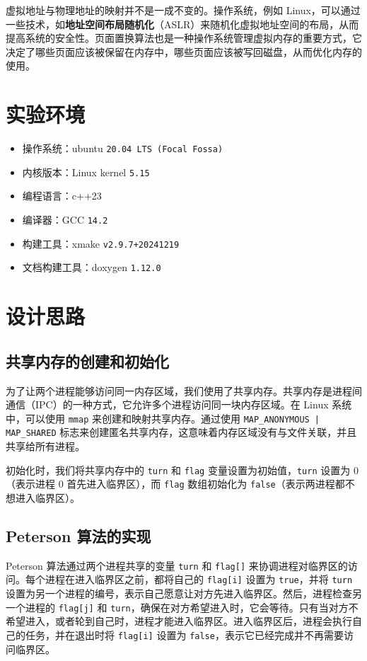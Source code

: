 虚拟地址与物理地址的映射并不是一成不变的。操作系统，例如 Linux，可以通过一些技术，如\textbf{地址空间布局随机化}（ASLR）来随机化虚拟地址空间的布局，从而提高系统的安全性。页面置换算法也是一种操作系统管理虚拟内存的重要方式，它决定了哪些页面应该被保留在内存中，哪些页面应该被写回磁盘，从而优化内存的使用。

\section{实验环境}

\begin{itemize}
    \item 操作系统：ubuntu \texttt{20.04 LTS (Focal Fossa)}
    \item 内核版本：Linux kernel \texttt{5.15}
    \item 编程语言：c++23
    \item 编译器：GCC \texttt{14.2}
    \item 构建工具：xmake \texttt{v2.9.7+20241219}
    \item 文档构建工具：doxygen \texttt{1.12.0}
\end{itemize}

\section{设计思路}

\subsection{共享内存的创建和初始化}

为了让两个进程能够访问同一内存区域，我们使用了共享内存。共享内存是进程间通信（IPC）的一种方式，它允许多个进程访问同一块内存区域。在 Linux 系统中，可以使用 \texttt{mmap} 来创建和映射共享内存。通过使用 \texttt{MAP\_ANONYMOUS | MAP\_SHARED} 标志来创建匿名共享内存，这意味着内存区域没有与文件关联，并且共享给所有进程。

初始化时，我们将共享内存中的 \texttt{turn} 和 \texttt{flag} 变量设置为初始值，\texttt{turn} 设置为 0（表示进程 0 首先进入临界区），而 \texttt{flag} 数组初始化为 \texttt{false}（表示两进程都不想进入临界区）。

\subsection{Peterson 算法的实现}

Peterson 算法通过两个进程共享的变量 \texttt{turn} 和 \texttt{flag[]} 来协调进程对临界区的访问。每个进程在进入临界区之前，都将自己的 \texttt{flag[i]} 设置为 \texttt{true}，并将 \texttt{turn} 设置为另一个进程的编号，表示自己愿意让对方先进入临界区。然后，进程检查另一个进程的 \texttt{flag[j]} 和 \texttt{turn}，确保在对方希望进入时，它会等待。只有当对方不希望进入，或者轮到自己时，进程才能进入临界区。进入临界区后，进程会执行自己的任务，并在退出时将 \texttt{flag[i]} 设置为 \texttt{false}，表示它已经完成并不再需要访问临界区。

